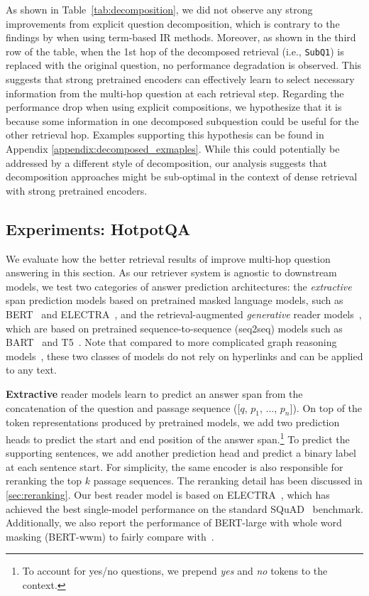 As shown in Table~\ref{tab:decomposition}, we did not observe any strong improvements from explicit question decomposition, which is contrary to the findings by \citet{Break} when using term-based IR methods. Moreover, as shown in the third row of the table, when the 1st hop of the decomposed retrieval (i.e., \texttt{SubQ1}) is replaced with the original question, no performance degradation is observed. This suggests that strong pretrained encoders can effectively learn to select necessary information from the multi-hop question at each retrieval step. Regarding the performance drop when using explicit compositions, we hypothesize that it is because some information in one decomposed subquestion could be useful for the other retrieval hop. Examples supporting this hypothesis can be found in Appendix \ref{appendix:decomposed_exmaples}. While this could potentially be addressed by a different style of decomposition, our analysis suggests that decomposition approaches might be sub-optimal in the context of dense retrieval with strong pretrained encoders.

\subsection{Experiments: HotpotQA}
\label{sec:exp-hotpotqa}

We evaluate how the better retrieval results of \method improve multi-hop question answering in this section. As our retriever system is agnostic to downstream models, we test two categories of answer prediction architectures: 
the \emph{extractive} span prediction models based on pretrained masked language models, such as BERT~\citep{BERT} and ELECTRA~\citep{ELECTRA},
and the retrieval-augmented \emph{generative} reader models~\citep{RAG,FiD}, which are based on pretrained sequence-to-sequence (seq2seq) models such as BART~\citep{BART} and T5~\citep{t5}. 
Note that compared to more complicated graph reasoning models~\citep{HGN,Transformer-XH}, these two classes of models do not rely on hyperlinks and can be applied to any text.

\textbf{Extractive} reader models learn to predict an answer span from the concatenation of the question and passage sequence ([$q$, $p_1$, ..., $p_n$]). On top of the token representations produced by pretrained models, we add two prediction heads to predict the start and end position of the answer span.\footnote{To account for yes/no questions, we prepend \emph{yes} and \emph{no} tokens to the context.} To predict the supporting sentences, we add another prediction head and predict a binary label at each sentence start. For simplicity, the same encoder is also responsible for reranking the top $k$ passage sequences. The reranking detail has been discussed in \cref{sec:reranking}. Our best reader model is based on ELECTRA~\citep{ELECTRA}, which has achieved the best single-model performance on the standard SQuAD~\citep{SQuAD} benchmark. Additionally, we also report the performance of BERT-large with whole word masking (BERT-wwm) to fairly compare with~\citet{GraphRecurrentRetriever}. 

